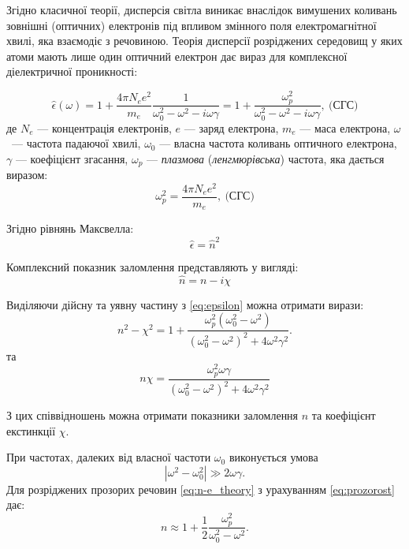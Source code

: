 Згідно класичної теорії, дисперсія світла виникає внаслідок вимушених коливань зовнішні (оптичних) електронів під впливом змінного поля електромагнітної хвилі, яка взаємодіє з речовиною. Теорія дисперсії розріджених середовищ у яких атоми мають лише один оптичний електрон дає вираз для комплексної діелектричної проникності:


\begin{equation}\label{eq:epsilon}
	\hat{\epsilon}(\omega)  = 1 + \frac{4\pi N_e e^2}{m_e}\frac{1}{\omega_0^2 - \omega^2 - i\omega\gamma} = 1 + \frac{\omega_p^2}{\omega_0^2 - \omega^2 - i\omega\gamma}, \ \text{(СГС)}
\end{equation}
де $N_e$ --- концентрація електронів, $e$ --- заряд електрона, $m_e$ --- маса електрона, $ \omega $~--- частота падаючої хвилі, $ \omega_0 $ --- власна частота коливань оптичного електрона, $ \gamma $ --- коефіцієнт згасання, $\omega_p$ --- \emph{плазмова} (\emph{ленгмюрівська}) частота, яка дається виразом:
\begin{equation}\label{eq:Lengmur}
	\omega_p^2 = \frac{4\pi N_e e^2}{m_e},\  \text{(СГС)}
\end{equation}


Згідно рівнянь Максвелла:
\begin{equation}\label{eq_dispersio:e=n^2}
	\hat{\epsilon} = \hat{n}^2
\end{equation}

Комплексний показник заломлення представляють у вигляді:
\begin{equation}\label{eq_dispersion: n}
	\hat{n} =  n  - i \chi
\end{equation}

Виділяючи дійсну та уявну частину з \eqref{eq:epsilon} можна отримати вирази:
\begin{equation}\label{eq:n-e_theory}
	n^2 - \chi^2 = 1 + \frac{\omega_p^2(\omega_0^2 - \omega^2)}{(\omega_0^2 - \omega^2)^2 + 4\omega^2\gamma^2}.
\end{equation}
та
\begin{equation}\label{eq:ne_theoty}
	n\chi = \frac{\omega_p^2 \omega\gamma}{(\omega_0^2 - \omega^2)^2 + 4\omega^2\gamma^2}
\end{equation}

З цих співвідношень можна отримати показники заломлення $n$ та коефіцієнт екстинкції $\chi$.

При частотах, далеких від власної частоти $\omega_0$ виконується умова
\begin{equation}\label{eq:prozorost}
	|\omega^2 - \omega_0^2| \gg 2\omega\gamma.
\end{equation}
Для розріджених прозорих речовин \eqref{eq:n-e_theory} з урахуванням \eqref{eq:prozorost} дає:
\begin{equation}\label{key}
	n \approx 1 + \frac12 \frac{\omega_p^2}{\omega_0^2 - \omega^2}.
\end{equation}

